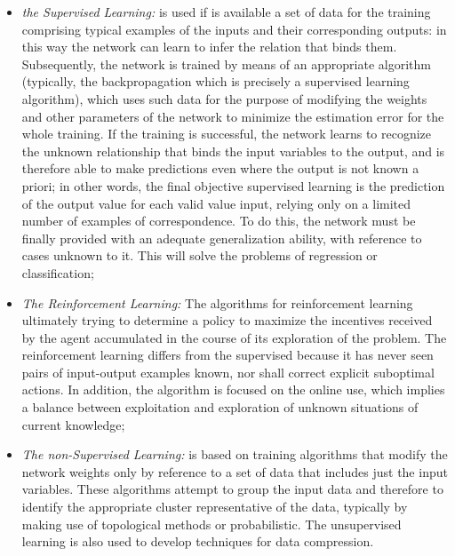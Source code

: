 \begin{itemize}
	\item \textit{the Supervised Learning:} is used if is available a set of data for the training comprising typical examples of the inputs and their corresponding outputs: in this way the network can learn to infer the relation that binds them. Subsequently, the network is trained by means of an appropriate algorithm (typically, the backpropagation which is precisely a supervised learning algorithm), which uses such data for the purpose of modifying the weights and other parameters of the network to minimize the estimation error for the whole training. If the training is successful, the network learns to recognize the unknown relationship that binds the input variables to the output, and is therefore able to make predictions even where the output is not known a priori; in other words, the final objective supervised learning is the prediction of the output value for each valid value input, relying only on a limited number of examples of correspondence. To do this, the network must be finally provided with an adequate generalization ability, with reference to cases unknown to it. This will solve the problems of regression or classification;
	
	\item \textit{The Reinforcement Learning:} The algorithms for reinforcement learning ultimately trying to determine a policy to maximize the incentives	received by the agent accumulated in the course of its exploration of the problem. The reinforcement learning differs from the supervised because it has never seen pairs of input-output examples known, nor shall correct explicit suboptimal actions.
	In addition, the algorithm is focused on the online use, which implies a balance between exploitation and exploration of unknown situations of current knowledge;
	
	\item \textit{The non-Supervised Learning:} is based on training algorithms that modify the network weights only	by reference to a set of data that includes just the input variables. These algorithms attempt to group the input data and therefore to identify the appropriate cluster representative of the data, typically by making use of topological methods or probabilistic. The unsupervised learning is also used to develop techniques for data compression.
	
\end{itemize}

